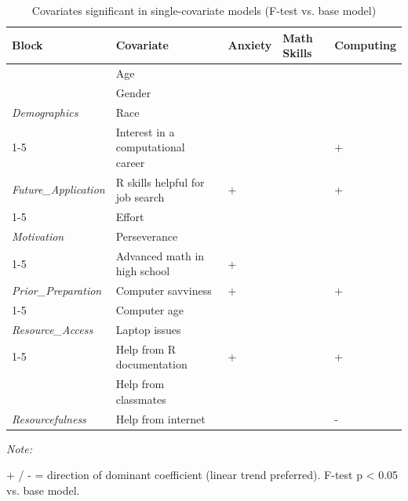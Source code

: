\begin{table}[!h]
\centering
\caption{Covariates significant in single-covariate models (F-test vs. base model)}
\centering
\begin{threeparttable}
\begin{tabular}[t]{>{}lllll}
\toprule
\textbf{Block} & \textbf{Covariate} & \textbf{Anxiety} & \textbf{Math Skills} & \textbf{Computing}\\
\midrule
 & Age &  &  & \\

 & Gender &  &  & \\

\multirow[t]{-2}{*}[\normalbaselineskip]{\raggedright\arraybackslash \em{Demographics}} & Race &  &  & \\
\cmidrule{1-5}
 & Interest in a computational career &  &  & +\\

\multirow[t]{-1}{*}[\normalbaselineskip]{\raggedright\arraybackslash \em{Future\_Application}} & R skills helpful for job search & + &  & +\\
\cmidrule{1-5}
 & Effort &  &  & \\

\multirow[t]{-1}{*}[\normalbaselineskip]{\raggedright\arraybackslash \em{Motivation}} & Perseverance &  &  & \\
\cmidrule{1-5}
 & Advanced math in high school & + &  & \\

\multirow[t]{-1}{*}[\normalbaselineskip]{\raggedright\arraybackslash \em{Prior\_Preparation}} & Computer savviness & + &  & +\\
\cmidrule{1-5}
 & Computer age &  &  & \\

\multirow[t]{-1}{*}[\normalbaselineskip]{\raggedright\arraybackslash \em{Resource\_Access}} & Laptop issues &  &  & \\
\cmidrule{1-5}
 & Help from R documentation & + &  & +\\

 & Help from classmates &  &  & \\

\multirow[t]{-2}{*}[\normalbaselineskip]{\raggedright\arraybackslash \em{Resourcefulness}} & Help from internet &  &  & -\\
\bottomrule
\end{tabular}
\begin{tablenotes}[para]
\item \textit{Note: } 
\item + / - = direction of dominant coefficient (linear trend preferred). F-test p < 0.05 vs. base model.
\end{tablenotes}
\end{threeparttable}
\end{table}
